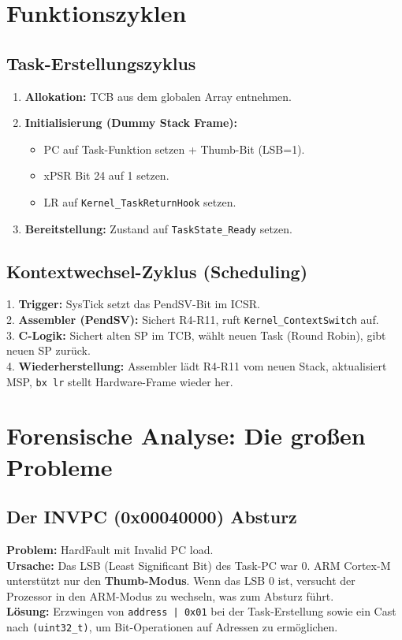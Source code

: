 \documentclass[11pt,a4paper]{article}
\begin{document}
\section{Funktionszyklen}

\subsection{Task-Erstellungszyklus}
\begin{enumerate}
    \item \textbf{Allokation:} TCB aus dem globalen Array entnehmen.
    \item \textbf{Initialisierung (Dummy Stack Frame):}
    \begin{itemize}
        \item PC auf Task-Funktion setzen + Thumb-Bit (LSB=1).
        \item xPSR Bit 24 auf 1 setzen.
        \item LR auf \texttt{Kernel\_TaskReturnHook} setzen.
    \end{itemize}
    \item \textbf{Bereitstellung:} Zustand auf \texttt{TaskState\_Ready} setzen.
\end{enumerate}

\subsection{Kontextwechsel-Zyklus (Scheduling)}
1. \textbf{Trigger:} SysTick setzt das PendSV-Bit im ICSR. \\
2. \textbf{Assembler (PendSV):} Sichert R4-R11, ruft \texttt{Kernel\_ContextSwitch} auf. \\
3. \textbf{C-Logik:} Sichert alten SP im TCB, wählt neuen Task (Round Robin), gibt neuen SP zurück. \\
4. \textbf{Wiederherstellung:} Assembler lädt R4-R11 vom neuen Stack, aktualisiert MSP, \texttt{bx lr} stellt Hardware-Frame wieder her.

\section{Forensische Analyse: Die großen Probleme}

\subsection{Der INVPC (0x00040000) Absturz}
\textbf{Problem:} HardFault mit Invalid PC load.\\
\textbf{Ursache:} Das LSB (Least Significant Bit) des Task-PC war 0. ARM Cortex-M unterstützt nur den \textbf{Thumb-Modus}. Wenn das LSB 0 ist, versucht der Prozessor in den ARM-Modus zu wechseln, was zum Absturz führt.\\
\textbf{Lösung:} Erzwingen von \texttt{address | 0x01} bei der Task-Erstellung sowie ein Cast nach \texttt{(uint32_t)}, um Bit-Operationen auf Adressen zu ermöglichen.
\end{document}
